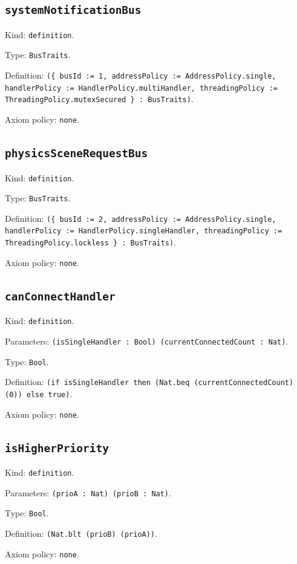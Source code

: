 \documentclass[11pt]{article}
\begin{document}
\subsection*{\texttt{systemNotificationBus}}
\noindent Kind: \texttt{definition}.\par
\noindent Type: \texttt{BusTraits}.\par
\noindent Definition: \texttt{(\{ busId := 1, addressPolicy := AddressPolicy.single, handlerPolicy := HandlerPolicy.multiHandler, threadingPolicy := ThreadingPolicy.mutexSecured \} : BusTraits)}.\par
\noindent Axiom policy: \texttt{none}.\par
\subsection*{\texttt{physicsSceneRequestBus}}
\noindent Kind: \texttt{definition}.\par
\noindent Type: \texttt{BusTraits}.\par
\noindent Definition: \texttt{(\{ busId := 2, addressPolicy := AddressPolicy.single, handlerPolicy := HandlerPolicy.singleHandler, threadingPolicy := ThreadingPolicy.lockless \} : BusTraits)}.\par
\noindent Axiom policy: \texttt{none}.\par
\subsection*{\texttt{canConnectHandler}}
\noindent Kind: \texttt{definition}.\par
\noindent Parameters: \texttt{(isSingleHandler : Bool) (currentConnectedCount : Nat)}.\par
\noindent Type: \texttt{Bool}.\par
\noindent Definition: \texttt{(if isSingleHandler then (Nat.beq (currentConnectedCount) (0)) else true)}.\par
\noindent Axiom policy: \texttt{none}.\par
\subsection*{\texttt{isHigherPriority}}
\noindent Kind: \texttt{definition}.\par
\noindent Parameters: \texttt{(prioA : Nat) (prioB : Nat)}.\par
\noindent Type: \texttt{Bool}.\par
\noindent Definition: \texttt{(Nat.blt (prioB) (prioA))}.\par
\noindent Axiom policy: \texttt{none}.\par
\end{document}
